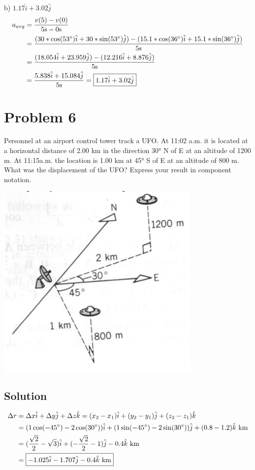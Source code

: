 \documentclass[12pt]{article}
\begin{document}
b) $1.17\hat{i} + 3.02\hat{j}$
\begin{align*}
    a_{avg} &= \frac{v(5) - v(0)}{5\unit{\s} - 0\unit{\s}}\\
        &= \frac{(30*\cos(53\degree)\hat{i} + 30*\sin(53\degree)\hat{j}) - (15.1*\cos(36\degree)\hat{i} + 15.1*\sin(36\degree)\hat{j})}{5 \unit{s}}\\
        &= \frac{(18.054\hat{i} + 23.959\hat{j}) - (12.216\hat{i} + 8.876\hat{j})}{5 \unit{s}}\\
        &= \frac{5.838\hat{i} + 15.084\hat{j}}{5 \unit{s}}
        = \boxed{1.17\hat{i} + 3.02\hat{j}}
\end{align*}

\pagebreak
\section*{Problem 6}
Personnel at an airport control tower track a UFO. At 11:02 a.m. it is located at a horizontal distance of 2.00 km in the direction 30° N of E at an altitude of 1200 m. At 11:15a.m. the location is 1.00 km at 45° S of E at an altitude of 800 m. What was the displacement of the UFO? Express your result in component notation.

\begin{center}
    \includegraphics*[width=10cm]{graph_6.png}
\end{center}

\subsection*{Solution}
\begin{align*}
    \Delta r &= \Delta x \hat{i} + \Delta y \hat{j} + \Delta z \hat{k} = (x_2 - x_1) \hat{i} + (y_2 - y_1) \hat{j} + (z_2 - z_1) \hat{k}\\
        &= (1\cos(-45\degree) - 2\cos(30\degree)) \hat{i} + (1\sin(-45\degree) - 2\sin(30\degree)) \hat{j} + (0.8 - 1.2) \hat{k}\ \unit{\kilo\meter}\\
        &= (\frac{\sqrt{2}}{2} - \sqrt{3}) \hat{i} + (-\frac{\sqrt{2}}{2} - 1) \hat{j} - 0.4 \hat{k}\ \unit{\kilo\meter}\\
        &= \boxed{-1.025 \hat{i} - 1.707 \hat{j} - 0.4 \hat{k}\ \unit{\kilo\meter}}
\end{align*}
\end{document}
